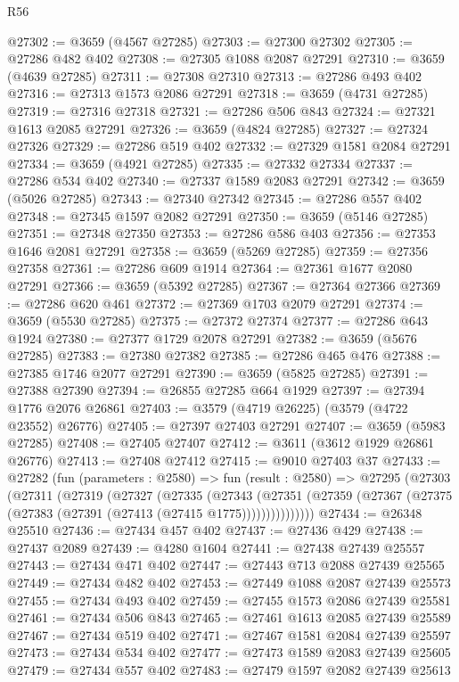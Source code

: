 \begin{lexlean}{R56}
\begin{coremodule}
@27302 := @3659 (@4567 @27285)
@27303 := @27300 @27302
@27305 := @27286 @482 @402
@27308 := @27305 @1088 @2087 @27291
@27310 := @3659 (@4639 @27285)
@27311 := @27308 @27310
@27313 := @27286 @493 @402
@27316 := @27313 @1573 @2086 @27291
@27318 := @3659 (@4731 @27285)
@27319 := @27316 @27318
@27321 := @27286 @506 @843
@27324 := @27321 @1613 @2085 @27291
@27326 := @3659 (@4824 @27285)
@27327 := @27324 @27326
@27329 := @27286 @519 @402
@27332 := @27329 @1581 @2084 @27291
@27334 := @3659 (@4921 @27285)
@27335 := @27332 @27334
@27337 := @27286 @534 @402
@27340 := @27337 @1589 @2083 @27291
@27342 := @3659 (@5026 @27285)
@27343 := @27340 @27342
@27345 := @27286 @557 @402
@27348 := @27345 @1597 @2082 @27291
@27350 := @3659 (@5146 @27285)
@27351 := @27348 @27350
@27353 := @27286 @586 @403
@27356 := @27353 @1646 @2081 @27291
@27358 := @3659 (@5269 @27285)
@27359 := @27356 @27358
@27361 := @27286 @609 @1914
@27364 := @27361 @1677 @2080 @27291
@27366 := @3659 (@5392 @27285)
@27367 := @27364 @27366
@27369 := @27286 @620 @461
@27372 := @27369 @1703 @2079 @27291
@27374 := @3659 (@5530 @27285)
@27375 := @27372 @27374
@27377 := @27286 @643 @1924
@27380 := @27377 @1729 @2078 @27291
@27382 := @3659 (@5676 @27285)
@27383 := @27380 @27382
@27385 := @27286 @465 @476
@27388 := @27385 @1746 @2077 @27291
@27390 := @3659 (@5825 @27285)
@27391 := @27388 @27390
@27394 := @26855 @27285 @664 @1929
@27397 := @27394 @1776 @2076 @26861
@27403 := @3579 (@4719 @26225) (@3579 (@4722 @23552) @26776)
@27405 := @27397 @27403 @27291
@27407 := @3659 (@5983 @27285)
@27408 := @27405 @27407
@27412 := @3611 (@3612 @1929 @26861 @26776)
@27413 := @27408 @27412
@27415 := @9010 @27403 @37
@27433 := @27282
    (fun (parameters : @2580) =>
    fun (result : @2580) =>
    @27295
      (@27303
        (@27311
          (@27319
            (@27327
              (@27335
                (@27343
                  (@27351
                    (@27359 (@27367 (@27375 (@27383 (@27391 (@27413 (@27415 @1775)))))))))))))))
@27434 := @26348 @25510
@27436 := @27434 @457 @402
@27437 := @27436 @429
@27438 := @27437 @2089
@27439 := @4280 @1604
@27441 := @27438 @27439 @25557
@27443 := @27434 @471 @402
@27447 := @27443 @713 @2088 @27439 @25565
@27449 := @27434 @482 @402
@27453 := @27449 @1088 @2087 @27439 @25573
@27455 := @27434 @493 @402
@27459 := @27455 @1573 @2086 @27439 @25581
@27461 := @27434 @506 @843
@27465 := @27461 @1613 @2085 @27439 @25589
@27467 := @27434 @519 @402
@27471 := @27467 @1581 @2084 @27439 @25597
@27473 := @27434 @534 @402
@27477 := @27473 @1589 @2083 @27439 @25605
@27479 := @27434 @557 @402
@27483 := @27479 @1597 @2082 @27439 @25613

\end{coremodule}
\end{lexlean}
